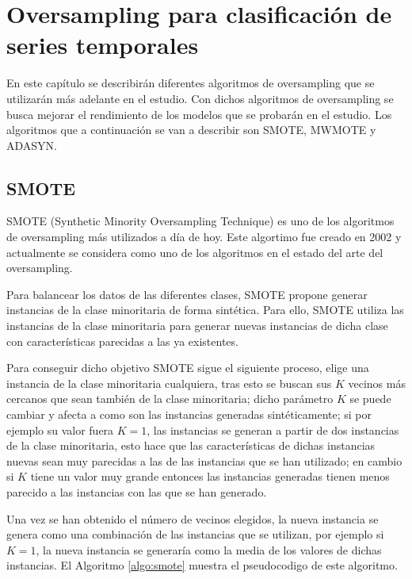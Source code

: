 \chapter{Oversampling para clasificación de series temporales}
En este capítulo se describirán diferentes algoritmos de oversampling que se utilizarán más adelante en el estudio. Con dichos algoritmos de oversampling se busca mejorar el rendimiento de los modelos que se probarán en el estudio. Los algoritmos que a continuación se van a describir son SMOTE, MWMOTE y ADASYN.

\section{SMOTE}
SMOTE (Synthetic Minority Oversampling Technique) \cite{chawla2002smote} es uno de los algoritmos de oversampling más utilizados a día de hoy. Este algortimo fue creado en 2002 y actualmente se considera como uno de los algoritmos en el estado del arte del oversampling.\newline

Para balancear los datos de las diferentes clases, SMOTE propone generar instancias de la clase minoritaria de forma sintética. Para ello, SMOTE utiliza las instancias de la clase minoritaria para generar nuevas instancias de dicha clase con características parecidas a las ya existentes.\newline

Para conseguir dicho objetivo SMOTE sigue el siguiente proceso, elige una instancia de la clase minoritaria cualquiera, tras esto se buscan sus $K$ vecinos más cercanos que sean también de la clase minoritaria; dicho parámetro $K$ se puede cambiar y afecta a como son las instancias generadas sintéticamente; si por ejemplo su valor fuera $K=1$, las instancias se generan a partir de dos instancias de la clase minoritaria, esto hace que las características de dichas instancias nuevas sean muy parecidas a las de las instancias que se han utilizado; en cambio si $K$ tiene un valor muy grande entonces las instancias generadas tienen menos parecido a las instancias con las que se han generado.\newline

Una vez se han obtenido el número de vecinos elegidos, la nueva instancia se genera como una combinación de las instancias que se utilizan, por ejemplo si $K=1$, la nueva instancia se generaría como la media de los valores de dichas instancias. El Algoritmo \ref{algo:smote} muestra el pseudocodigo de este algoritmo.\newline

